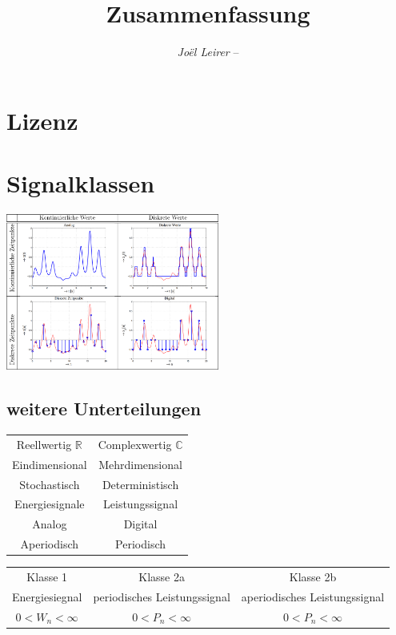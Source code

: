 \documentclass[margin=normal]{tex/hsrzf}
\author{\textsl{Joël Leirer} -- \texttt{\theauthoremail}}
\title{\texttt{\themodule} Zusammenfassung}
\date{\thesemester}
\begin{document}

\maketitle



\section*{Lizenz}
\doclicenseThis
\clearpage
\tableofcontents

\clearpage
\setcounter{page}{1}

\section{Signalklassen}
\begin{multicols}{2}
  \includegraphics[width = 7cm]{img/Signalklassen.png}
  \subsection{weitere Unterteilungen}
    \begin{tabular}{|c|c|}
    Reellwertig $\mathbb{R}$  &  Complexwertig $\mathbb{C}$ \\
    Eindimensional & Mehrdimensional\\
    Stochastisch & Deterministisch \\
    Energiesignale & Leistungssignal \\
    Analog & Digital \\
    Aperiodisch & Periodisch \\
    \end{tabular}
\end{multicols}
\begin{tabular}{ccc}
  Klasse 1 &
  Klasse 2a &
  Klasse 2b\\
  Energiesiegnal & periodisches Leistungssignal & aperiodisches Leistungssignal\\
  $0 < W_n < \infty $ & $0 < P_n < \infty $ & $0 < P_n < \infty$

\end{tabular}
 
\end{document}
